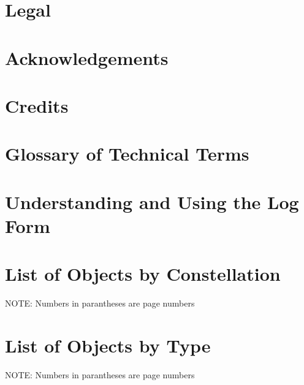 \documentclass[oneside]{book}
\begin{document}
\author{The Astronomy Logbook Project}



\chapter{Legal}
\label{Legal}



\chapter{Acknowledgements}



\chapter{Credits}



\mainmatter

\chapter{Glossary of Technical Terms}



\chapter{Understanding and Using the Log Form}



\setlength{\hangindent}{0cm}
\setlength{\parindent}{0cm}

\twocolumn
\chapter{List of Objects by Constellation}
NOTE: Numbers in parantheses are page numbers \\



\chapter{List of Objects by Type}
NOTE: Numbers in parantheses are page numbers \\



\end{document}
